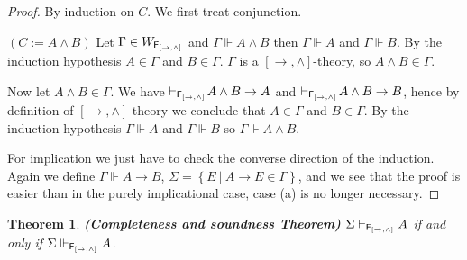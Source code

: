 \documentclass[12pt]{article}
\newtheorem{thm}{Theorem}[section]
\newtheorem{dfn}[thm]{Definition}
\begin{document}
\begin{proof}
By induction on $C$.
We first treat conjunction.

$ (C:=A\wedge B) $ Let $ \Gamma \in  W_{{\sf F_{  [\rightarrow , \wedge]}}}$ and $  \Gamma\Vdash A\wedge B  $ then $  \Gamma\Vdash A  $ and $  \Gamma\Vdash B  $. By the induction hypothesis $ A \in \Gamma $ and $ B \in \Gamma $. $ \Gamma $ is a ${[\rightarrow, \wedge]}$-theory, so $ A\wedge B \in \Gamma $.

Now let $ A\wedge B \in \Gamma $. We have $\vdash_{{\sf F_{[\rightarrow , \wedge]}} }\!A\wedge B\rightarrow A $ and $ \vdash_{{\sf F_{[\rightarrow , \wedge]}} }\!A\wedge B\rightarrow B$, hence by definition  of ${[\rightarrow, \wedge]}$-theory we conclude that  $ A \in \Gamma $ and $ B \in \Gamma $. By the induction hypothesis $  \Gamma\Vdash A  $ and $  \Gamma\Vdash B  $ so $  \Gamma\Vdash A\wedge B  $.

For implication we just have to check the converse direction of the induction.
Again we define $  \Gamma\Vdash A\rightarrow B $, $ \Sigma = \left\lbrace  E ~|~A\rightarrow E \in \Gamma\right\rbrace $, and we see that the proof is easier than in the purely implicational case, case (a) is no longer necessary.
\end{proof}














\begin{thm}
\em\textbf{(Completeness and soundness Theorem)} $ \Sigma\vdash_{{\sf F_{[\rightarrow , \wedge]}} } A $ if and only if $ \Sigma\Vdash_{{\sf F_{[\rightarrow , \wedge]}} } A $.
\end{thm}
\end{document}
